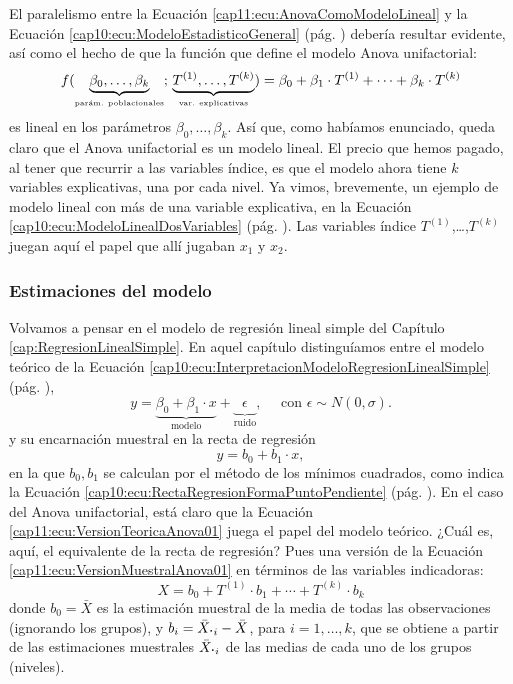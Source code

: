 El paralelismo entre la Ecuación \ref{cap11:ecu:AnovaComoModeloLineal} y la Ecuación \ref{cap10:ecu:ModeloEstadisticoGeneral} (pág. \pageref{cap10:ecu:ModeloEstadisticoGeneral}) debería resultar evidente, así como el hecho de que la función que define el modelo Anova unifactorial:
\begin{equation}
\label{cap11:ecu:FuncionDefineAnovaComoModeloLineal}
f(\underbrace{\beta_0,\ldots, \beta_k}_{\mbox{\tiny parám. poblacionales}};\,\underbrace{T^{(1)},\ldots,T^{(k)}}_{\mbox{\tiny var. explicativas}})=
\beta_0+\beta_1\cdot T^{(1)}+\cdots+\beta_k\cdot T^{(k)}
\end{equation}
es lineal en los parámetros $\beta_0,\ldots, \beta_k$. Así que, como habíamos enunciado, queda
claro que el Anova unifactorial es un modelo lineal. El precio que hemos pagado, al tener que recurrir a las variables índice, es que el modelo ahora tiene $k$ variables explicativas, una por cada nivel. Ya  vimos, brevemente, un ejemplo de modelo lineal con más de una variable explicativa, en la Ecuación \ref{cap10:ecu:ModeloLinealDosVariables} (pág. \pageref{cap10:ecu:ModeloLinealDosVariables}). Las variables índice $T^{(1)}$,\ldots,$T^{(k)}$ juegan aquí el papel que allí jugaban $x_1$ y $x_2$.

\subsubsection{Estimaciones del modelo}

Volvamos a pensar en el modelo de regresión lineal simple del
Capítulo \ref{cap:RegresionLinealSimple}. En aquel capítulo distinguíamos entre el modelo teórico de la Ecuación \ref{cap10:ecu:InterpretacionModeloRegresionLinealSimple} (pág. \pageref{cap10:ecu:InterpretacionModeloRegresionLinealSimple}),
    \[
        y=
        \underbrace{\beta_0 +\beta_1\cdot x}_{\mbox{modelo}}
        +
        \underbrace{\phantom{\beta}\epsilon\phantom{\beta}}_{\mbox{ruido}},
        \quad\mbox{ con }\epsilon\sim N(0,\sigma).
    \]
y su encarnación muestral en la recta de regresión
\[y=b_0+b_1\cdot x,\]
en la que $b_0, b_1$ se calculan por el método de los mínimos cuadrados, como indica la Ecuación
\ref{cap10:ecu:RectaRegresionFormaPuntoPendiente} (pág.
\pageref{cap10:ecu:RectaRegresionFormaPuntoPendiente}). En el caso del Anova unifactorial, está
claro que la Ecuación \ref{cap11:ecu:VersionTeoricaAnova01} juega el papel del modelo teórico.
¿Cuál es, aquí, el equivalente de la recta de regresión? Pues una versión de la Ecuación
\ref{cap11:ecu:VersionMuestralAnova01} en términos de las variables indicadoras:
\begin{equation}
\label{cap11:ecu:AnovapseudoRectaRegresion}
        X=
        b_0+T^{(1)}\cdot b_1+\cdots+T^{(k)}\cdot b_k
\end{equation}
donde $b_0=\bar X$ es la estimación muestral de la media de todas las observaciones (ignorando los
grupos), y $b_i=\bar X_{{\mbox{\bf\large$\cdot$}}i}-\bar{X}$, para $i=1,\ldots,k$, que se obtiene a
partir de las estimaciones muestrales $\bar X_{{\mbox{\bf\large$\cdot$}}i}$ de las medias de cada
uno de los grupos (niveles).

